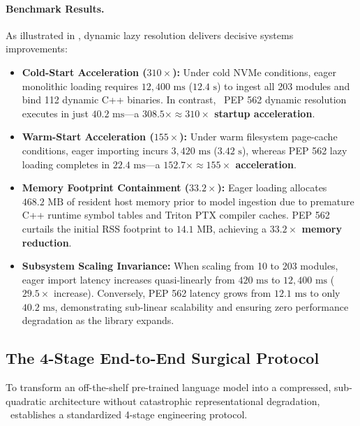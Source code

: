 \paragraph{Benchmark Results.} As illustrated in , dynamic lazy resolution delivers decisive systems improvements:
\begin{itemize}
    \item \textbf{Cold-Start Acceleration ($310\times$):} Under cold NVMe conditions, eager monolithic loading requires \textbf{$12{,}400\text{ ms}$} ($12.4\text{ s}$) to ingest all 203 modules and bind 112 dynamic C++ binaries. In contrast, \neuralops\ PEP 562 dynamic resolution executes in just \textbf{$40.2\text{ ms}$}---a \textbf{$308.5\times \approx 310\times$ startup acceleration}.
    \item \textbf{Warm-Start Acceleration ($155\times$):} Under warm filesystem page-cache conditions, eager importing incurs $3{,}420\text{ ms}$ ($3.42\text{ s}$), whereas PEP 562 lazy loading completes in \textbf{$22.4\text{ ms}$}---a \textbf{$152.7\times \approx 155\times$ acceleration}.
    \item \textbf{Memory Footprint Containment ($33.2\times$):} Eager loading allocates $468.2\text{ MB}$ of resident host memory prior to model ingestion due to premature C++ runtime symbol tables and Triton PTX compiler caches. PEP 562 curtails the initial RSS footprint to \textbf{$14.1\text{ MB}$}, achieving a \textbf{$33.2\times$ memory reduction}.
    \item \textbf{Subsystem Scaling Invariance:} When scaling from 10 to 203 modules, eager import latency increases quasi-linearly from $420\text{ ms}$ to $12{,}400\text{ ms}$ ($29.5\times$ increase). Conversely, PEP 562 latency grows from $12.1\text{ ms}$ to only $40.2\text{ ms}$, demonstrating sub-linear scalability and ensuring zero performance degradation as the library expands.
\end{itemize}

\subsection{The 4-Stage End-to-End Surgical Protocol}
\label{subsec:surgical_protocol}

To transform an off-the-shelf pre-trained language model into a compressed, sub-quadratic architecture without catastrophic representational degradation, \neuralops\ establishes a standardized 4-stage engineering protocol.

